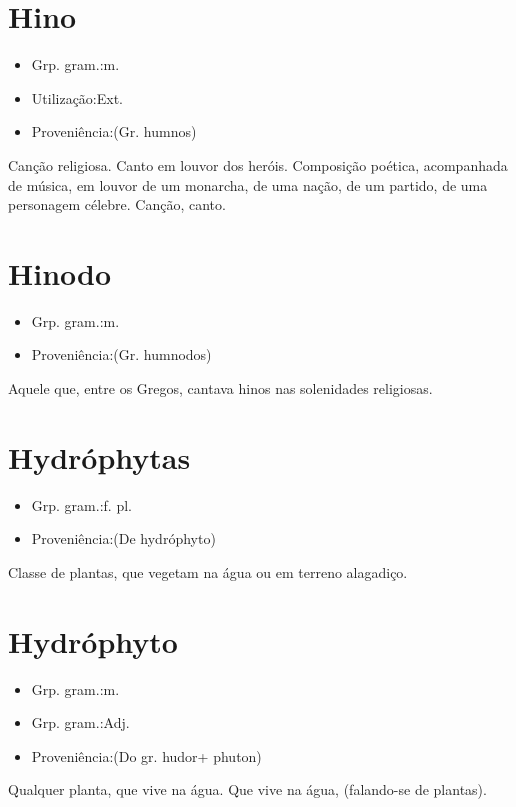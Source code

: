 \documentclass{article}
\begin{document}
\section{Hino}
\begin{itemize}
\item {Grp. gram.:m.}
\end{itemize}
\begin{itemize}
\item {Utilização:Ext.}
\end{itemize}
\begin{itemize}
\item {Proveniência:(Gr. \textunderscore humnos\textunderscore )}
\end{itemize}
Canção religiosa.
Canto em louvor dos heróis.
Composição poética, acompanhada de música, em louvor de um monarcha, de uma nação, de um partido, de uma personagem célebre.
Canção, canto.
\section{Hinodo}
\begin{itemize}
\item {Grp. gram.:m.}
\end{itemize}
\begin{itemize}
\item {Proveniência:(Gr. \textunderscore humnodos\textunderscore )}
\end{itemize}
Aquele que, entre os Gregos, cantava hinos nas solenidades religiosas.
\section{Hydróphytas}
\begin{itemize}
\item {Grp. gram.:f. pl.}
\end{itemize}
\begin{itemize}
\item {Proveniência:(De \textunderscore hydróphyto\textunderscore )}
\end{itemize}
Classe de plantas, que vegetam na água ou em terreno alagadiço.
\section{Hydróphyto}
\begin{itemize}
\item {Grp. gram.:m.}
\end{itemize}
\begin{itemize}
\item {Grp. gram.:Adj.}
\end{itemize}
\begin{itemize}
\item {Proveniência:(Do gr. \textunderscore hudor\textunderscore  + \textunderscore phuton\textunderscore )}
\end{itemize}
Qualquer planta, que vive na água.
Que vive na água, (falando-se de plantas).
\end{document}
